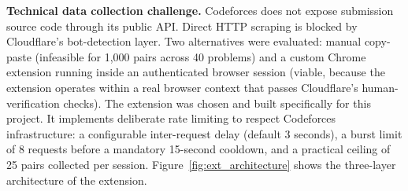 \textbf{Technical data collection challenge.} Codeforces does not expose submission source code through its public API. Direct HTTP scraping is blocked by Cloudflare's bot-detection layer. Two alternatives were evaluated: manual copy-paste (infeasible for 1,000 pairs across 40 problems) and a custom Chrome extension running inside an authenticated browser session (viable, because the extension operates within a real browser context that passes Cloudflare's human-verification checks). The extension was chosen and built specifically for this project. It implements deliberate rate limiting to respect Codeforces infrastructure: a configurable inter-request delay (default 3 seconds), a burst limit of 8 requests before a mandatory 15-second cooldown, and a practical ceiling of 25 pairs collected per session. Figure~\ref{fig:ext_architecture} shows the three-layer architecture of the extension.

